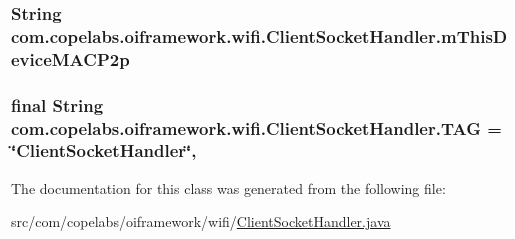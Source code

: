 \subsubsection[{m\+This\+Device\+M\+A\+C\+P2p}]{\setlength{\rightskip}{0pt plus 5cm}String com.\+copelabs.\+oiframework.\+wifi.\+Client\+Socket\+Handler.\+m\+This\+Device\+M\+A\+C\+P2p\hspace{0.3cm}{\ttfamily [private]}}\label{classcom_1_1copelabs_1_1oiframework_1_1wifi_1_1_client_socket_handler_a65203e6b9fafa174ef63042dbbec81b4}
\hypertarget{classcom_1_1copelabs_1_1oiframework_1_1wifi_1_1_client_socket_handler_abca4184271635acce97826e479458213}{}
\subsubsection[{T\+A\+G}]{\setlength{\rightskip}{0pt plus 5cm}final String com.\+copelabs.\+oiframework.\+wifi.\+Client\+Socket\+Handler.\+T\+A\+G = \char`\"{}Client\+Socket\+Handler\char`\"{}\hspace{0.3cm}{\ttfamily [static]}, {\ttfamily [private]}}\label{classcom_1_1copelabs_1_1oiframework_1_1wifi_1_1_client_socket_handler_abca4184271635acce97826e479458213}


The documentation for this class was generated from the following file\+:\begin{DoxyCompactItemize}
\item 
src/com/copelabs/oiframework/wifi/\hyperlink{_client_socket_handler_8java}{Client\+Socket\+Handler.\+java}\end{DoxyCompactItemize}
